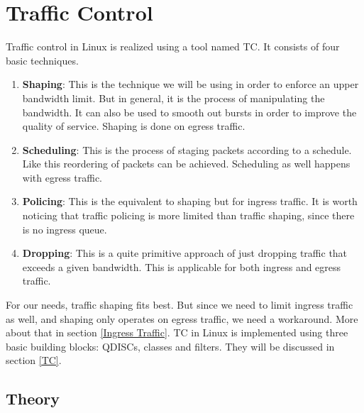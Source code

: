 \chapter{Traffic Control}
Traffic control in Linux is realized using a tool named \acs{TC}. It consists of four basic techniques.

\begin{enumerate}
\item \textbf{Shaping}: This is the technique we will be using in order to enforce an upper bandwidth limit. But in general, it is the process of manipulating the bandwidth. It can also be used to smooth out bursts in order to improve the quality of service. Shaping is done on egress traffic.

\item \textbf{Scheduling}: This is the process of staging packets according to a schedule. Like this reordering of packets can be achieved. Scheduling as well happens with egress traffic.

\item \textbf{Policing}: This is the equivalent to shaping but for ingress traffic. It is worth noticing that traffic policing is more limited than traffic shaping, since there is no ingress queue.

\item \textbf{Dropping}: This is a quite primitive approach of just dropping traffic that exceeds a given bandwidth. This is applicable for both ingress and egress traffic.
\end{enumerate}

For our needs, traffic shaping fits best. But since we need to limit ingress traffic as well, and shaping only operates on egress traffic, we need a workaround. More about that in section  \ref{Ingress Traffic}. \acl{TC} in Linux is implemented using three basic building blocks: \acp{QDISC}, classes and filters. They will be discussed in section \ref{TC}.

\section{Theory}

